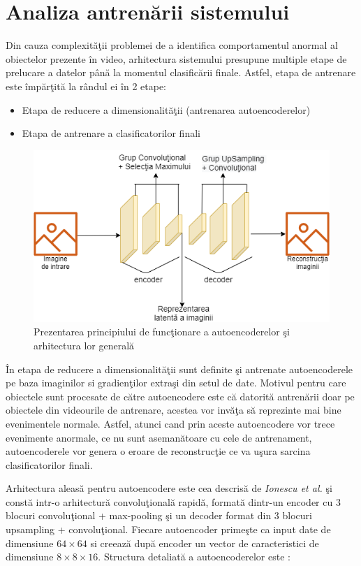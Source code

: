 \documentclass[a4paper,12pt]{report}
\begin{document}
\section{Analiza antrenării sistemului}
\quad Din cauza complexităţii problemei de a identifica comportamentul anormal al obiectelor prezente în video, arhitectura sistemului presupune multiple etape de prelucare a datelor până la momentul clasificării finale. Astfel, etapa de antrenare este împărţită la rândul ei în 2 etape:
\begin{itemize}
\item Etapa de reducere a dimensionalităţii (antrenarea autoencoderelor)
\item Etapa de antrenare a clasificatorilor finali
\end{itemize}
\begin{figure}[h]
\begin{center}
        \includegraphics[width=1\textwidth]{images/arhitectura_autoencoder}
			 \caption{Prezentarea principiului de funcţionare a autoencoderelor şi arhitectura lor generală}
			 \label{fig:arhitectura_autoencoder}
\end{center}
\end{figure}
\par În etapa de reducere a dimensionalităţii sunt definite şi antrenate autoencoderele pe baza imaginilor si gradienţilor extraşi din setul de date. Motivul pentru care obiectele sunt procesate de către autoencodere este că datorită antrenării doar pe obiectele din videourile de antrenare, acestea vor invăţa să reprezinte mai bine evenimentele normale. Astfel, atunci cand prin aceste autoencodere vor trece evenimente anormale, ce nu sunt asemanătoare cu cele de antrenament, autoencoderele vor genera o eroare de reconstrucţie ce va uşura sarcina clasificatorilor finali.
\par Arhitectura aleasă pentru autoencodere este cea descrisă de \emph{Ionescu et al.}  \cite{ionescu2019object} şi constă intr-o arhitectură convoluţională rapidă, formată dintr-un encoder cu 3 blocuri convoluţional + max-pooling şi un decoder format din 3 blocuri upsampling + convoluţional. Fiecare autoencoder primeşte ca input date de dimensiune \(64 \times 64\) si creează după encoder un vector de caracteristici de dimensiune \(8 \times 8 \times 16\).  Structura detaliată a autoencoderelor este : 
\end{document}
